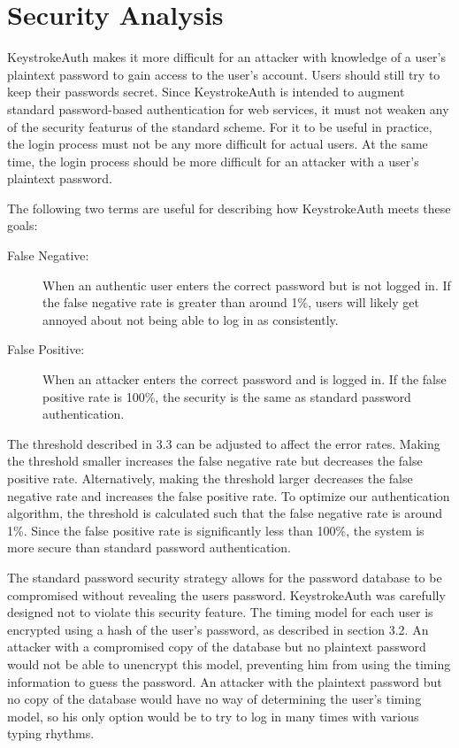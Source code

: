 \documentclass{article}
\begin{document}
\section{Security Analysis}
KeystrokeAuth makes it more difficult for an attacker with knowledge of a user's plaintext password to gain access to the user's account.
Users should still try to keep their passwords secret.
Since KeystrokeAuth is intended to augment standard password-based authentication for web services, it must not weaken any of the security featurus of the standard scheme. 
For it to be useful in practice, the login process must not be any more difficult for actual users.
At the same time, the login process should be more difficult for an attacker with a user's plaintext password.

The following two terms are useful for describing how KeystrokeAuth meets these goals:

\begin{description}
  \item[False Negative:] When an authentic user enters the correct password but is not logged in. If the false negative rate is greater than around 1\%, users will likely get annoyed about not being able to log in as consistently.
  \item[False Positive:] When an attacker enters the correct password and is logged in. If the false positive rate is 100\%, the security is the same as standard password authentication.
\end{description}

The threshold described in 3.3 can be adjusted to affect the error rates. 
Making the threshold smaller increases the false negative rate but decreases the false positive rate.
Alternatively, making the threshold larger decreases the false negative rate and increases the false positive rate. 
To optimize our authentication algorithm, the threshold is calculated such that the false negative rate is around 1\%.
Since the false positive rate is significantly less than 100\%, the system is more secure than standard password authentication.

The standard password security strategy allows for the password database to be compromised without revealing the users password.
KeystrokeAuth was carefully designed not to violate this security feature.
The timing model for each user is encrypted using a hash of the user's password, as described in section 3.2. 
An attacker with a compromised copy of the database but no plaintext password would not be able to unencrypt this model, preventing him from using the timing information to guess the password.
An attacker with the plaintext password but no copy of the database would have no way of determining the user's timing model, so his only option would be to try to log in many times with various typing rhythms. 
\end{document}
